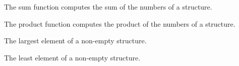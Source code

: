 The sum function computes the sum of the numbers of a structure.

The product function computes the product of the numbers of a structure.

The largest element of a non-empty structure.

The least element of a non-empty structure.
